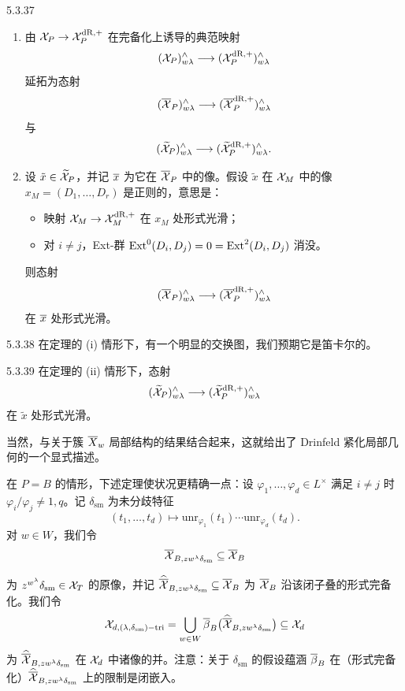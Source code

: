 \begin{thm}{5.3.37}\label{thm:a4-5-3-37}
\begin{enumerate}[label=(\roman*),leftmargin=2.2em,itemsep=0.2em]
\item 由 $\mathcal{X}_P\to\mathcal{X}_P^{\mathrm{dR},+}$ 在完备化上诱导的典范映射
\[
(\mathcal{X}_P)^{\wedge}_{w\lambda}\longrightarrow(\mathcal{X}_P^{\mathrm{dR},+})^{\wedge}_{w\lambda}
\]
延拓为态射
\[
(\overline{\mathcal{X}}_P)^{\wedge}_{w\lambda}\longrightarrow(\overline{\mathcal{X}}_P^{\mathrm{dR},+})^{\wedge}_{w\lambda}
\]
与
\[
(\widetilde{\mathcal{X}}_P)^{\wedge}_{w\lambda}\longrightarrow(\widetilde{\mathcal{X}}_P^{\mathrm{dR},+})^{\wedge}_{w\lambda}.
\]
\item 设 $\tilde x\in\widetilde{\mathcal{X}}_P$，并记 $\overline x$ 为它在 $\overline{\mathcal{X}}_P$ 中的像。假设 $\tilde x$ 在 $\mathcal{X}_M$ 中的像 $x_M=(D_1,\dots,D_r)$ 是正则的，意思是：
\begin{itemize}[label=--,leftmargin=2.2em,itemsep=0.1em]
\item 映射 $\mathcal{X}_M\to\mathcal{X}_M^{\mathrm{dR},+}$ 在 $x_M$ 处形式光滑；
\item 对 $i\neq j$，Ext-群 $\operatorname{Ext}^0(D_i,D_j)=0=\operatorname{Ext}^2(D_i,D_j)$ 消没。
\end{itemize}
则态射
\[
(\overline{\mathcal{X}}_P)^{\wedge}_{w\lambda}\longrightarrow(\overline{\mathcal{X}}_P^{\mathrm{dR},+})^{\wedge}_{w\lambda}
\]
在 $\overline x$ 处形式光滑。
\end{enumerate}
\end{thm}

\begin{rem}{5.3.38}\label{thm:a4-5-3-38}
在定理的 (i) 情形下，有一个明显的交换图，我们预期它是笛卡尔的。
\end{rem}

\begin{conj}{5.3.39}\label{thm:a4-5-3-39}
在定理的 (ii) 情形下，态射
\[
(\widetilde{\mathcal{X}}_P)^{\wedge}_{w\lambda}\longrightarrow(\widetilde{\mathcal{X}}_P^{\mathrm{dR},+})^{\wedge}_{w\lambda}
\]
在 $\tilde x$ 处形式光滑。
\end{conj}

当然，与关于簇 $\overline X_w$ 局部结构的结果结合起来，这就给出了 Drinfeld 紧化局部几何的一个显式描述。

在 $P=B$ 的情形，下述定理使状况更精确一点：设 $\varphi_1,\dots,\varphi_d\in L^\times$ 满足 $i\neq j$ 时 $\varphi_i/\varphi_j\neq1,q$。记 $\delta_{\mathrm{sm}}$ 为未分歧特征
\[
(t_1,\dots,t_d)\longmapsto\mathrm{unr}_{\varphi_1}(t_1)\cdots\mathrm{unr}_{\varphi_d}(t_d).
\]
对 $w\in W$，我们令
\[
\overline{\mathcal{X}}_{B,zw^\lambda\delta_{\mathrm{sm}}}\subseteq\overline{\mathcal{X}}_B
\]

为 $z^{w^\lambda}\delta_{\mathrm{sm}}\in\mathcal{X}_T$ 的原像，并记 $\widehat{\overline{\mathcal{X}}}_{B,zw^\lambda\delta_{\mathrm{sm}}}\subseteq\overline{\mathcal{X}}_B$ 为 $\overline{\mathcal{X}}_B$ 沿该闭子叠的形式完备化。我们令
\[
\mathcal{X}_{d,(\lambda,\delta_{\mathrm{sm}})-\mathrm{tri}}=\bigcup_{w\in W}\overline\beta_B\bigl(\widehat{\overline{\mathcal{X}}}_{B,zw^\lambda\delta_{\mathrm{sm}}}\bigr)\subseteq\mathcal{X}_d
\]
为 $\widehat{\overline{\mathcal{X}}}_{B,zw^\lambda\delta_{\mathrm{sm}}}$ 在 $\mathcal{X}_d$ 中诸像的并。注意：关于 $\delta_{\mathrm{sm}}$ 的假设蕴涵 $\overline\beta_B$ 在（形式完备化）$\widehat{\overline{\mathcal{X}}}_{B,zw^\lambda\delta_{\mathrm{sm}}}$ 上的限制是闭嵌入。

